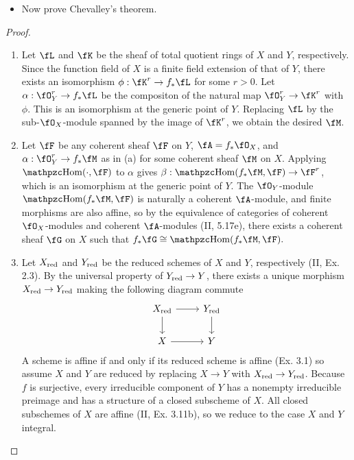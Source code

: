 \documentclass[a4paper]{article}
\begin{document}
\begin{enumerate} [label=\textbf{\arabic*.}, leftmargin=0em]
\begin{itemize}
          \item[(c)] Now prove Chevalley's theorem.
        \end{itemize}

        \begin{proof} $ $ \vspace{0pt}
          \begin{enumerate} [label=(\alph*), leftmargin=0cm]

            \item Let $\fL$ and $\fK$ be the sheaf of total quotient rings of $X$ and $Y$, respectively.
                  Since the function field of $X$ is a finite field extension of that of $Y$, there exists an isomorphism $\phi : \fK^r \to f_*\fL$ for some $r > 0$.
                  Let $\alpha : \fO_Y^r \to f_*\fL$ be the compositon of the natural map $\fO_Y^r \to \fK^r$ with $\phi$.
                  This is an isomorphism at the generic point of $Y$.
                  Replacing $\fL$ by the sub-$\fO_X$-module spanned by the image of $\fK^r$, we obtain the desired $\fM$.

            \item Let $\fF$ be any coherent sheaf $\fF$ on $Y$, $\fA = f_*\fO_X$, and $\alpha : \fO_Y^r \to f_* \fM$ as in (a) for some coherent sheaf $\fM$ on $X$.
                  Applying $\rHom(\cdot, \fF)$ to $\alpha$ gives $\beta : \rHom(f_*\fM, \fF) \to \fF^r$,
                  which is an isomorphism at the generic point of $Y$.
                  The $\fO_Y$-module $\rHom(f_*\fM, \fF)$ is naturally a coherent $\fA$-module, and finite morphisms are also affine, so by the equivalence of categories of coherent $\fO_X$-modules and coherent $\fA$-modules (II, 5.17e), there exists a coherent sheaf $\fG$ on $X$ such that $f_*\fG \cong \rHom(f_*\fM, \fF).$

            \item Let ${X}_\text{red}$ and ${Y}_\text{red}$ be the reduced schemes of $X$ and $Y$, respectively (II, Ex. 2.3). By the universal property of ${Y}_\text{red} \to Y$, there exists a unique morphism ${X}_\text{red} \to {Y}_\text{red}$ making the following diagram commute
                  \[ \begin{tikzcd}
                      \red{X} \arrow[d] \arrow[r] & \red{Y} \arrow[d] \\
                      X \arrow[r]                 & Y
                    \end{tikzcd} \]
                  A scheme is affine if and only if its reduced scheme is affine (Ex. 3.1) so assume $X$ and $Y$ are reduced by replacing $X \to Y$ with ${X}_\text{red} \to {Y}_\text{red}$.
                  Because $f$ is surjective, every irreducible component of $Y$ has a nonempty irreducible preimage and has a structure of a closed subscheme of $X$.
                  All closed subschemes of $X$ are affine (II, Ex. 3.11b), so we reduce to the case $X$ and $Y$ integral.


\end{enumerate}
\end{proof}
\end{enumerate}
\end{document}
